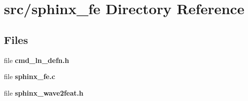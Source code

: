 \section{src/sphinx\-\_\-fe Directory Reference}
\label{dir_d8c91649ada281f16a03908005e3aeeb}
\subsection*{Files}
\begin{DoxyCompactItemize}
\item 
file {\bfseries cmd\-\_\-ln\-\_\-defn.\-h}
\item 
file {\bfseries sphinx\-\_\-fe.\-c}
\item 
file {\bfseries sphinx\-\_\-wave2feat.\-h}
\end{DoxyCompactItemize}
